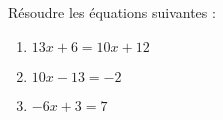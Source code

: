 \documentclass[a4paper,11pt,exos]{nsi} %
\begin{document}
\maketitle




\begin{exercice}
Résoudre les équations suivantes :
\begin{multicols}{3}
	\begin{enumerate}
		\item $13x+6=10x+12$
		\item $10x-13=-2$
		\item $-6x+3=7$
	\end{enumerate}
\end{multicols}

\end{exercice}
\end{document}
